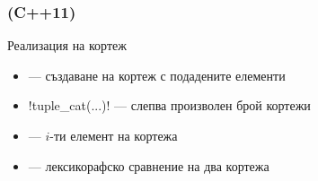 \documentclass{beamer}
\begin{document}
\begin{frame}
  \frametitle{ (C++11)}

  Реализация на кортеж
  \begin{itemize}
  \item {} --- създаване на кортеж с подадените елементи
  \item \lst!tuple_cat(...)! --- слепва произволен брой кортежи
  \item {} --- $i$-ти елемент на кортежа
  \item \lst {==,!=,<,>,<=,>=} --- лексикорафско сравнение на два кортежа
  \end{itemize}
\end{frame}
\end{document}
